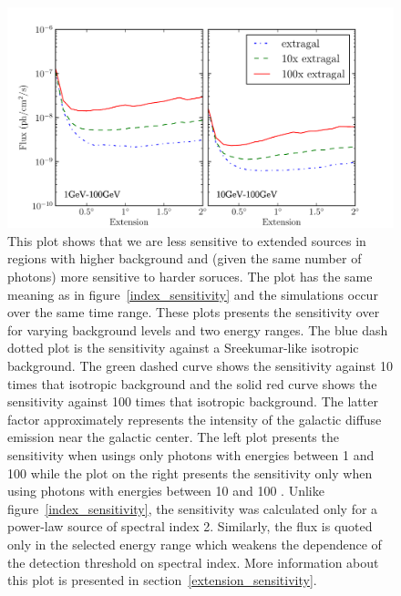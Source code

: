 \documentclass[12pt,preprint]{aastex}
\newcommand{\gev}{\text{GeV}\xspace}
\begin{document}
\clearpage

\begin{figure}
  \begin{center}
    \includegraphics{mc_plots/diff_factor_sensitivity.pdf}
    \end{center}
    \caption{
    This plot shows that we are less sensitive to extended sources in
    regions with higher background and (given the same number of photons)
    more sensitive to harder soruces.  The plot has the same meaning as
    in figure~\ref{index_sensitivity} and the simulations occur over
    the same time range.  These plots presents the sensitivity over
    for varying background levels and two energy ranges.  The blue dash
    dotted plot is the sensitivity against a Sreekumar-like isotropic
    background. The green dashed curve shows the sensitivity against 10
    times that isotropic background and the solid red curve shows the
    sensitivity against 100 times that isotropic background.  The latter
    factor approximately represents the intensity of the galactic
    diffuse emission near the galactic center.  The left plot presents
    the sensitivity when usings only photons with energies between 1 \gev
    and 100 \gev while the plot on the right presents the sensitivity only
    when using photons with energies between 10 \gev and 100 \gev. Unlike
    figure~\ref{index_sensitivity}, the sensitivity was calculated only
    for a power-law source of spectral index 2. Similarly, the flux is
    quoted only in the selected energy range which weakens the dependence
    of the detection threshold on spectral index.  More information
    about this plot is presented in section~\ref{extension_sensitivity}.
    }\label{diff_factor_sensitivity}
  \end{figure}
\end{document}
